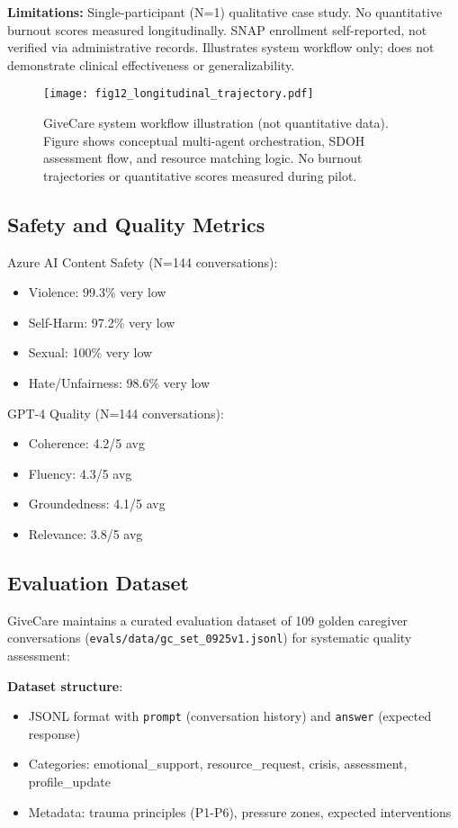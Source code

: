 \documentclass{article}
\begin{document}
\textbf{Limitations:} Single-participant (N=1) qualitative case study. No quantitative burnout scores measured longitudinally. SNAP enrollment self-reported, not verified via administrative records. Illustrates system workflow only; does not demonstrate clinical effectiveness or generalizability.

%
\begin{figure}[htbp]%
\centering%
\texttt{[image: fig12\_longitudinal\_trajectory.pdf]}%
\caption{GiveCare system workflow illustration (not quantitative data). Figure shows conceptual multi-agent orchestration, SDOH assessment flow, and resource matching logic. No burnout trajectories or quantitative scores measured during pilot.}%
\label{fig:longitudinal}%
\end{figure}%
\subsection{Safety and Quality Metrics}%
\label{subsec:SafetyandQualityMetrics}%
Azure AI Content Safety (N=144 conversations):
\begin{itemize}
    \item Violence: 99.3\% very low
    \item Self-Harm: 97.2\% very low
    \item Sexual: 100\% very low
    \item Hate/Unfairness: 98.6\% very low
\end{itemize}

GPT-4 Quality (N=144 conversations):
\begin{itemize}
    \item Coherence: 4.2/5 avg
    \item Fluency: 4.3/5 avg
    \item Groundedness: 4.1/5 avg
    \item Relevance: 3.8/5 avg
\end{itemize}

%
\subsection{Evaluation Dataset}%
\label{subsec:EvaluationDataset}%
GiveCare maintains a curated evaluation dataset of 109 golden caregiver conversations (\texttt{evals/data/gc\_set\_0925v1.jsonl}) for systematic quality assessment:

\textbf{Dataset structure}:
\begin{itemize}
    \item JSONL format with \texttt{prompt} (conversation history) and \texttt{answer} (expected response)
    \item Categories: emotional\_support, resource\_request, crisis, assessment, profile\_update
    \item Metadata: trauma principles (P1-P6), pressure zones, expected interventions
\end{itemize}
\end{document}
